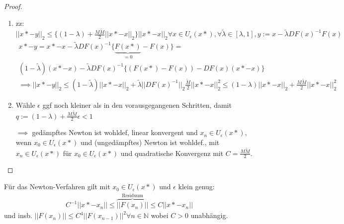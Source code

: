 \begin{proof}
\begin{enumerate}
		\item zz: $||x* - y||_2 \leq \{(1-\lambda) + \frac{M\tilde{M}}{2} ||x* - x||_2 \} ||x* - x||_2 \forall x \in U_\epsilon(x*), \forall \tilde{\lambda} \in [\lambda, 1], y:= x - \tilde{\lambda} DF(x)^{-1} F(x)$
		\begin{align*}
			x* - y = x* - x - \tilde{\lambda} DF(x)^{-1} \{\underbrace{F(x*)}_{=0} - F(x)\} =\\
			(1-\tilde{\lambda}) (x* - x) - \tilde{\lambda} DF(x)^{-1} \{ (F(x*) - F(x)) - DF(x)(x*-x) \}\\
			\implies ||x* - y||_2 \leq (1-\tilde{\lambda}) ||x*-x||_2 + \tilde{\lambda} ||DF(x)^{-1}||_2 \frac{\tilde{M}}{2} ||x* - x||_2^2 \leq
			(1-\lambda) ||x*-x||_2 + \frac{M \tilde{M}}{2} ||x* - x||_2^2
		\end{align*}
		
		\item Wähle $\epsilon$ ggf noch kleiner als in den vorausgegangenen Schritten, damit $q := (1-\lambda) + \frac{M \tilde{M}}{2} \epsilon < 1$
		
		$\implies$ gedämpftes Newton ist wohldef, linear konvergent und $x_n \in U_\epsilon(x*)$, wenn $x_0 \in U_\epsilon(x*)$ und (ungedämpftes) Newton ist wohldef., mit $x_n \in U_\epsilon(x*)$ für $x_0 \in U_\epsilon(x*)$ und quadratische Konvergenz mit $C = \frac{M \tilde{M}}{2}$.
	\end{enumerate}
\end{proof}

\begin{corollary}
	Für das Newton-Verfahren gilt mit $x_0 \in U_\epsilon(x*)$ und $\epsilon$ klein genug:
	\begin{align*}
		C^{-1} ||x* - x_n|| \leq \overbrace{||F(x_n)||}^{\text{Residuum}} \leq C||x* - x_n||
	\end{align*}
	und insb. $||F(x_n)|| \leq C^4 ||F(x_{n-1})||^2 \forall n \in \mathbb{N}$ wobei $C > 0$ unabhängig.
\end{corollary}

